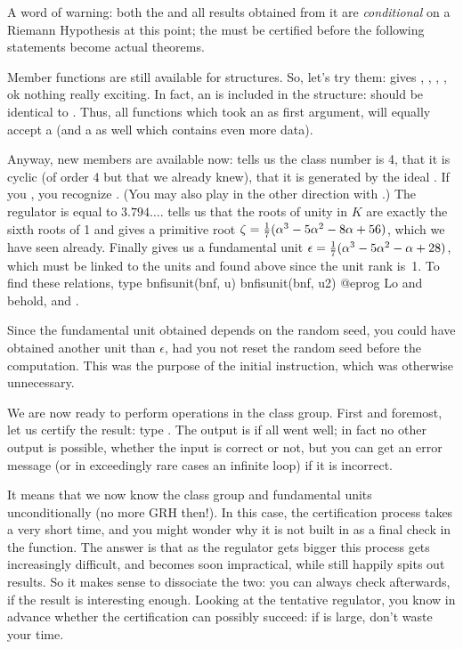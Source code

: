 A word of warning: both the  and all results obtained from it are
\emph{conditional} on a Riemann Hypothesis at this point; the  must
be certified before the following statements become actual theorems.
\smallskip

Member functions are still available for  structures. So, let's try
them:  gives , , ,
, ok nothing really exciting. In fact, an  is included
in the  structure:  should be identical to
. Thus, all functions which took an  as first argument, will
equally accept a  (and a  as well which contains even more
data).

Anyway, new members are available now:  tells us the class number
is 4,  that it is cyclic (of order 4 but that we already knew),
 that it is generated by the ideal . If you
, you recognize . (You may also play in
the other direction with .) The regulator  is
equal to $3.794\dots$.  tells us that the roots of unity in $K$
are exactly the sixth roots of 1 and gives a primitive root $\zeta =
{1\over7}(\alpha^3 - 5\alpha^2 - 8\alpha + 56)$, which we have seen already.
Finally  gives us a fundamental unit $\epsilon =
{1\over7}(\alpha^3 - 5\alpha^2 - \alpha + 28)$, which must be linked to the
units  and  found above since the unit rank is~1. To find
these relations, type
\bprog
  bnfisunit(bnf, u)
  bnfisunit(bnf, u2)
@eprog\noindent
Lo and behold,  and .

 Since the fundamental unit obtained depends on the random
seed, you could have obtained another unit than $\epsilon$, had you not reset
the random seed before the computation. This was the purpose of the initial
 instruction, which was otherwise unnecessary.\medskip

We are now ready to perform operations in the class group. First and
foremost, let us certify the result: type . The
output is  if all went well; in fact no other output is possible,
whether the input is correct or not, but you can get an error message (or in
exceedingly rare cases an infinite loop) if it is incorrect.

It means that we now know the class group and fundamental units
unconditionally (no more GRH then!). In this case, the certification process
takes a very short time, and you might wonder why it is not built in as a
final check in the  function. The answer is that as the
regulator gets bigger this process gets increasingly difficult, and becomes
soon impractical, while  still happily spits out results. So it
makes sense to dissociate the two: you can always check afterwards, if the
result is interesting enough. Looking at the tentative regulator, you know in
advance whether the certification can possibly succeed: if  is
large, don't waste your time.


